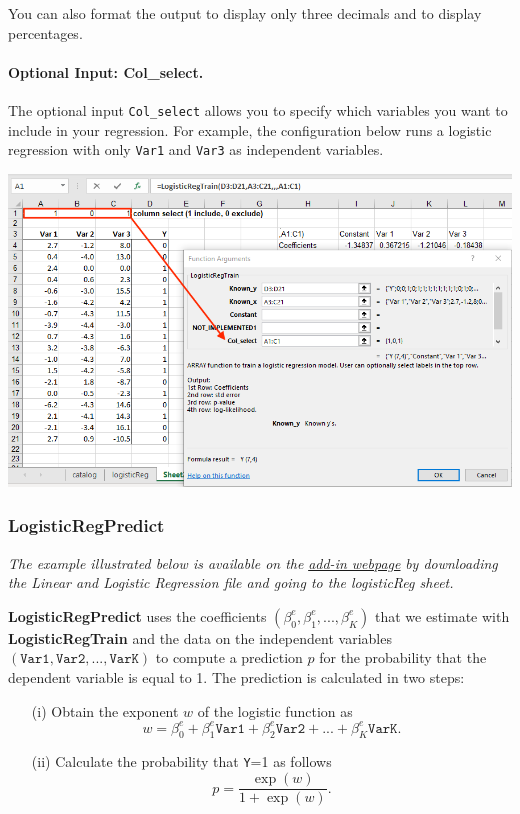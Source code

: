 \documentclass[12pt]{article}
\begin{document}
You can also format the output to display only three decimals and to display percentages.

\paragraph{Optional Input: Col\_select.} The optional input \texttt{Col\_select} allows you to specify which variables you want to include in your regression. For example, the configuration below runs a logistic regression with only \texttt{Var1} and \texttt{Var3} as independent variables.
\medskip

\centerline{\includegraphics[width=6in]{figures/LogRegTrainOptional1}}

\medskip

\subsubsection{LogisticRegPredict}

\textit{The example illustrated below is available on the}  \href{https://www8.gsb.columbia.edu/bizanalytics/excel-add-in/multiplatform#h-4}{ \textit{add-in webpage}}
 \textit{by downloading the Linear and Logistic Regression file and going to the logisticReg sheet.}

\textbf{LogisticRegPredict} uses the coefficients $(\beta_0^{e},\beta_1^{e},...,\beta_K^{e})$ that we estimate with \textbf{LogisticRegTrain} and the data on the independent variables $(\texttt{Var1},\texttt{Var2},...,\texttt{VarK})$ to compute a prediction $p$ for the probability that the dependent variable is equal to 1. The prediction is calculated in two steps:
\begin{itemize}
\item[(i)] Obtain the exponent $w$ of the logistic function as
\[
w=\beta_0^{e}+\beta_1^{e} \texttt{Var1}+\beta_2^{e} \texttt{Var2} +...+ \beta_K^{e} \texttt{VarK}.
\]
\item[(ii)] Calculate the probability that \texttt{Y}=1 as follows
\[
p=\frac{\exp(w)}{1+\exp(w)}.
\]
\end{itemize}
\end{document}

